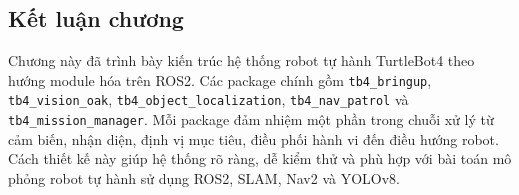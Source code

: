 \subsection{Kết luận chương}
\label{subsec:chapter3-conclusion}

Chương này đã trình bày kiến trúc hệ thống robot tự hành TurtleBot4 theo hướng module hóa trên ROS2. Các package chính gồm \texttt{tb4\_bringup}, \texttt{tb4\_vision\_oak}, \texttt{tb4\_object\_localization}, \texttt{tb4\_nav\_patrol} và \texttt{tb4\_mission\_manager}. Mỗi package đảm nhiệm một phần trong chuỗi xử lý từ cảm biến, nhận diện, định vị mục tiêu, điều phối hành vi đến điều hướng robot. Cách thiết kế này giúp hệ thống rõ ràng, dễ kiểm thử và phù hợp với bài toán mô phỏng robot tự hành sử dụng ROS2, SLAM, Nav2 và YOLOv8.